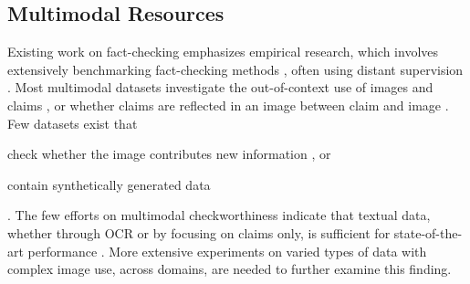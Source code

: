\subsection{Multimodal Resources}
Existing work on fact-checking emphasizes empirical research, which involves extensively benchmarking fact-checking methods \citep{schlichtkrull2024averitec, papadopoulos2024verite}, often using distant supervision \citep{nakamura2020fakeddit, zlatkova2019fact}. Most multimodal datasets investigate the out-of-context use of images and claims \citep{luo2021newsclippings, tonglet2024image}, or whether claims are reflected in an image between claim and image \citep{yoon2024assessing, papadopoulos2023synthetic}. Few datasets exist that
\begin{enumerate*}[label=(\arabic*)]
    \item check whether the image contributes new information \citep{liu2024mmfakebench}, or
    \item contain synthetically generated data \citep{xu2023combating, seow2022comprehensive}
\end{enumerate*}. The few efforts on multimodal checkworthiness indicate that textual data, whether through OCR or by focusing on claims only, is sufficient for state-of-the-art performance \citep{frick2023fraunhofer}. More extensive experiments on varied types of data with complex image use, across domains, are needed to further examine this finding.
